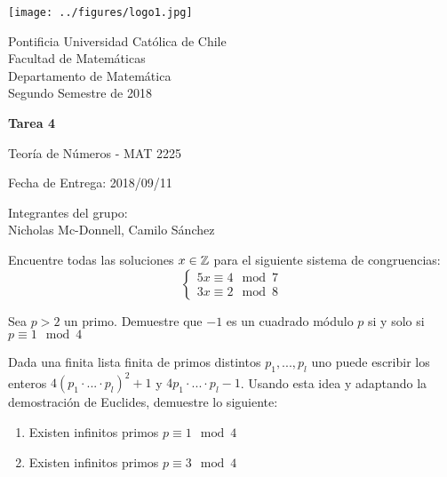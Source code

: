 


\begin{minipage}{2.5cm}
	\texttt{[image: ../figures/logo1.jpg]}
\end{minipage}
\begin{minipage}{13cm}
	\begin{flushleft}
		\raggedright
		{
			\noindent
			{\sc Pontificia Universidad Católica de Chile\\
				Facultad de Matemáticas\\
				Departamento de Matemática} \smallskip \\
			Segundo Semestre de 2018\\
		}
	\end{flushleft}
\end{minipage}

\vspace{2ex}
{\Large \centerline{\bf Tarea 4}}
{\large \centerline{Teoría de Números - MAT 2225}}
\centerline{Fecha de Entrega: 2018/09/11}

\begin{flushright}
	Integrantes del grupo:\\
	Nicholas Mc-Donnell, Camilo Sánchez
\end{flushright}

\begin{prob}[3 pts]
	Encuentre todas las soluciones $x\in\mathbb{Z}$ para el siguiente sistema de congruencias:
	\[\begin{cases}
			5x\equiv 4\mod 7 \\
			3x\equiv 2\mod 8
		\end{cases}\]
\end{prob}

\begin{sol}
	
\end{sol}

\begin{prob}[3 pts]
	Sea $p>2$ un primo. Demuestre que $-1$ es un cuadrado módulo $p$ si y solo si $p\equiv1\mod4$
\end{prob}

\begin{sol}
	
\end{sol}

\begin{prob}[3 pts c/u]
	Dada una finita lista finita de primos distintos $p_1,...,p_l$ uno puede escribir los enteros $4(p_1\cdot...\cdot p_l)^2+1$ y $4p_1\cdot...\cdot p_l-1$. Usando esta idea y adaptando la demostración de Euclides, demuestre lo siguiente:
	\begin{enumerate}[label = \roman*)]
		\item Existen infinitos primos $p\equiv 1\mod 4$

		\item Existen infinitos primos $p\equiv 3\mod 4$
	\end{enumerate}
\end{prob}

